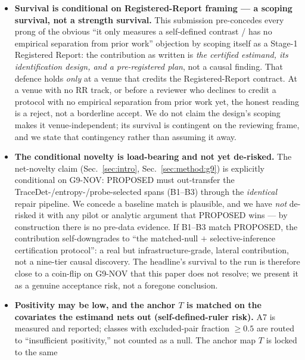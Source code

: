 \documentclass[11pt]{article}
\theoremstyle{plain}
\theoremstyle{definition}
\begin{document}
\begin{itemize}[leftmargin=1.4em,itemsep=2pt]
{  fortiori} not of the secondary, conditional causal reading the certificate may later
  license. What is falsifiable \emph{now} is the machinery (the green do-not-run
  harness); the certificate is falsifiable only after the authorized run, and the
  conditional causal reading only further, under A5--A9. We state this as an accepted
  acceptance risk, not a resolved one.
  \item \textbf{Survival is conditional on Registered-Report framing --- a scoping
  survival, not a strength survival.} This submission pre-concedes every prong of the
  obvious ``it only measures a self-defined contrast / has no empirical separation from
  prior work'' objection by scoping itself as a Stage-1 Registered Report: the
  contribution as written is \emph{the certified estimand, its identification design,
  and a pre-registered plan}, not a causal finding. That defence holds \emph{only} at a
  venue that credits the Registered-Report contract. At a venue with no RR track, or
  before a reviewer who declines to credit a protocol with no empirical separation from
  prior work yet, the honest reading is a reject, not a borderline accept. We do not
  claim the design's scoping makes it venue-independent; its survival is contingent on
  the reviewing frame, and we state that contingency rather than assuming it away.
  \item \textbf{The conditional novelty is load-bearing and not yet de-risked.} The
  net-novelty claim (Sec.~\ref{sec:intro}, Sec.~\ref{sec:method:g9}) is explicitly
  conditional on G9-NOV: PROPOSED must out-transfer the TraceDet-/entropy-/probe-selected
  spans (B1--B3) through the \emph{identical} repair pipeline. We concede a baseline match
  is plausible, and we have \emph{not} de-risked it with any pilot or analytic argument
  that PROPOSED wins --- by construction there is no pre-data evidence. If B1--B3 match
  PROPOSED, the contribution self-downgrades to ``the matched-null $+$ selective-inference
  certification protocol'': a real but infrastructure-grade, lateral contribution, not a
  nine-tier causal discovery. The headline's survival to the run is therefore close to a
  coin-flip on G9-NOV that this paper does not resolve; we present it as a genuine
  acceptance risk, not a foregone conclusion.
  \item \textbf{Positivity may be low, and the anchor $T$ is matched on the covariates
  the estimand nets out (self-defined-ruler risk).} A7 is measured and reported;
  classes with excluded-pair fraction $\ge0.5$ are routed to ``insufficient
  positivity,'' not counted as a null. The anchor map $T$ is locked to the same

\end{itemize}
\end{document}
